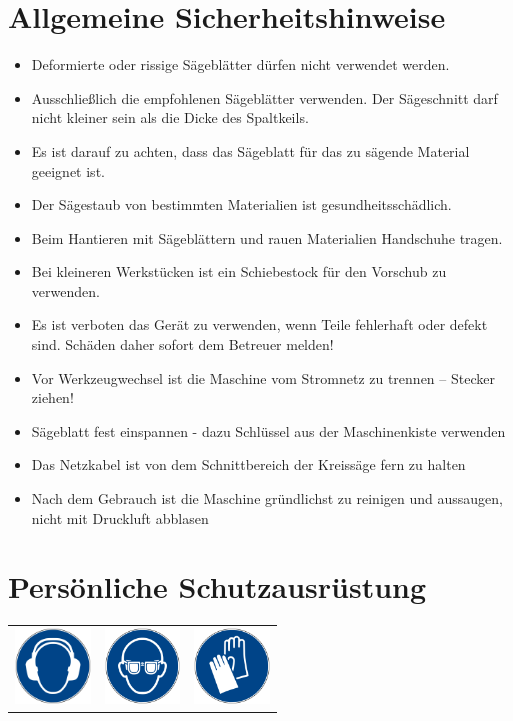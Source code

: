 \documentclass{\basedir/fablab-document}
\begin{document}
\section[Allgemeine Sicherheitshinweise]{Allgemeine Sicherheitshinweise}
\begin{itemize}

\item Deformierte oder rissige Sägeblätter dürfen nicht verwendet werden.
\item Ausschließlich die empfohlenen Sägeblätter verwenden. Der Sägeschnitt darf nicht kleiner sein als die Dicke des Spaltkeils.
\item Es ist darauf zu achten, dass das Sägeblatt für das zu sägende Material geeignet ist.
\item Der Sägestaub von bestimmten Materialien ist gesundheitsschädlich.
\item Beim Hantieren mit Sägeblättern und rauen Materialien Handschuhe tragen.
\item Bei kleineren Werkstücken ist ein Schiebestock für den Vorschub zu verwenden.
\item Es ist verboten das Gerät zu verwenden, wenn Teile fehlerhaft oder defekt sind. Schäden daher sofort dem Betreuer melden!
\item Vor Werkzeugwechsel ist die Maschine vom Stromnetz zu trennen -- Stecker ziehen!
\item Sägeblatt fest einspannen - dazu Schlüssel aus der Maschinenkiste verwenden
\item Das Netzkabel ist von dem Schnittbereich der Kreissäge fern zu halten
\item Nach dem Gebrauch ist die Maschine gründlichst zu reinigen und aussaugen, nicht mit Druckluft abblasen
\end{itemize}


\section{Persönliche Schutzausrüstung}
\begin{table}[h]
	\centering
\begin{tabular}{ccc}

\includegraphics[width=2cm]{bilder/ggehoerschutz.png} & \includegraphics[width=2cm]{bilder/gaugenschutz.png}  & \includegraphics[width=2cm]{bilder/ghandschuh.png} \\
 \end{tabular}
\end{table}
\end{document}
